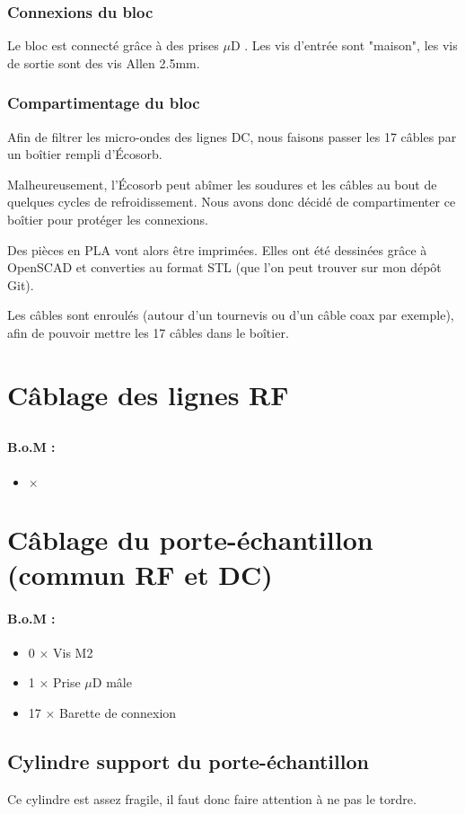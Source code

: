 \documentclass[a4paper,11pt]{article}
\newcommand{\fois}{$\times$ }
\newcommand{\uD}{$\mu$D }
\newenvironment{BOM}
  {%
    \paragraph{B.o.M : } \begin{itemize}%
  }{%
    \end{itemize}\medskip%
  }
\begin{document}
\subsubsection{Connexions du bloc}
Le bloc est connecté grâce à des prises \uD. Les vis d'entrée sont "maison", les vis de sortie sont des vis Allen 2.5mm.

\subsubsection{Compartimentage du bloc}
Afin de filtrer les micro-ondes des lignes DC, nous faisons passer les 17 câbles par un boîtier rempli d'Écosorb.

Malheureusement, l'Écosorb peut abîmer les soudures et les câbles au bout de quelques cycles de refroidissement. Nous avons donc décidé de compartimenter ce boîtier pour protéger les connexions.

Des pièces en PLA vont alors être imprimées. Elles ont été dessinées grâce à OpenSCAD et converties au format STL (que l'on peut trouver sur mon dépôt Git).

Les câbles sont enroulés (autour d'un tournevis ou d'un câble coax par exemple), afin de pouvoir mettre les 17 câbles dans le boîtier.

\section{Câblage des lignes RF}

\subsection{}
\begin{BOM}
    \item  \fois
\end{BOM}


\section{Câblage du porte-échantillon (commun RF et DC)}
\begin{BOM}
    \item 0 \fois Vis M2
    \item 1 \fois Prise \uD mâle
    \item 17 \fois Barette de connexion
\end{BOM}
\subsection{Cylindre support du porte-échantillon}
Ce cylindre est assez fragile, il faut donc faire attention à ne pas le tordre.\medskip
\end{document}
